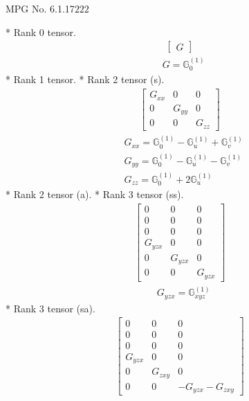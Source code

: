 \documentclass[fleqn,8pt,landscape]{jsarticle}
\begin{document}
\setcounter{MaxMatrixCols}{32}

\renewcommand{\tablename}{Table~}
\renewcommand{\figurename}{Figure~}
\begin{center}
\LARGE
MPG No. 6.1.17\quad$222$
\end{center}
* Rank 0 tensor.
\begin{align*}
\begin{bmatrix} G \end{bmatrix}
\end{align*}
\begin{align*}
& G = \mathbb{G}_{0}^{(1)}
\end{align*}
* Rank 1 tensor.
* Rank 2 tensor (s).
\begin{align*}
\begin{bmatrix} G_{xx} & 0 & 0 \\ 0 & G_{yy} & 0 \\ 0 & 0 & G_{zz} \end{bmatrix}
\end{align*}
\begin{align*}
& G_{xx} = \mathbb{G}_{0}^{(1)} - \mathbb{G}_{u}^{(1)} + \mathbb{G}_{v}^{(1)} \\
& G_{yy} = \mathbb{G}_{0}^{(1)} - \mathbb{G}_{u}^{(1)} - \mathbb{G}_{v}^{(1)} \\
& G_{zz} = \mathbb{G}_{0}^{(1)} + 2 \mathbb{G}_{u}^{(1)}
\end{align*}
* Rank 2 tensor (a).
* Rank 3 tensor (ss).
\begin{align*}
\begin{bmatrix} 0 & 0 & 0 \\ 0 & 0 & 0 \\ 0 & 0 & 0 \\ G_{yzx} & 0 & 0 \\ 0 & G_{yzx} & 0 \\ 0 & 0 & G_{yzx} \end{bmatrix}
\end{align*}
\begin{align*}
& G_{yzx} = \mathbb{G}_{xyz}^{(1)}
\end{align*}
* Rank 3 tensor (sa).
\begin{align*}
\begin{bmatrix} 0 & 0 & 0 \\ 0 & 0 & 0 \\ 0 & 0 & 0 \\ G_{yzx} & 0 & 0 \\ 0 & G_{zxy} & 0 \\ 0 & 0 & - G_{yzx} - G_{zxy} \end{bmatrix}
\end{align*}
\end{document}
